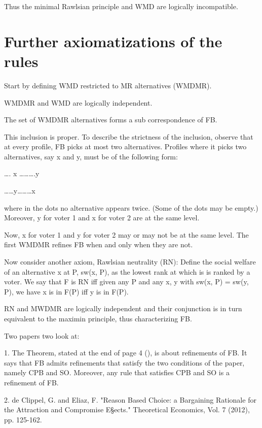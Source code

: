 \documentclass[version=3.21, pagesize, twoside=off, bibliography=totoc, DIV=calc, fontsize=12pt, a4paper]{scrartcl}
\begin{document}
Thus the minimal Rawlsian principle and WMD are logically incompatible. 

\section{Further axiomatizations of the rules}



Start by defining WMD restricted to MR alternatives (WMDMR).

WMDMR and WMD are logically independent.

The set of WMDMR alternatives forms a sub correspondence of FB.

This inclusion is proper. To describe the strictness of the inclusion, observe that at every profile, FB picks at most two alternatives. Profiles where it picks two alternatives, say x and y, must be of the following form:

…. x ……….y

 ……y………x

where in the dots no alternative appears twice. (Some of the dots may be empty.) Moreover, y for voter 1 and x for voter 2 are at the same level.

Now, x for voter 1 and y for voter 2 may or may not be at the same level. The first WMDMR refines FB when and only when they are not. 

Now consider another axiom, Rawlsian neutrality (RN): Define the social welfare of an alternative x at P, sw(x, P), as the lowest rank at which is is ranked by a voter. We say that F is RN iff given any P and any x, y with sw(x, P) = sw(y, P), we have x is in F(P) iff y is in F(P).

RN and MWDMR are logically independent and their conjunction is in turn equivalent to the maximin principle, thus characterizing FB.

Two papers two look at:

1. The Theorem, stated at the end of page 4 (), is about refinements of FB. It says that FB admits refinements that satisfy the two conditions of the paper, namely CPB and SO. Moreover, any rule that satisfies CPB and SO is a refinement of FB. 

2. de Clippel, G. and Eliaz, F. "Reason Based Choice: a Bargaining Rationale for the
Attraction and Compromise E§ects." Theoretical Economics, Vol. 7 (2012), pp. 125-162.
\end{document}
